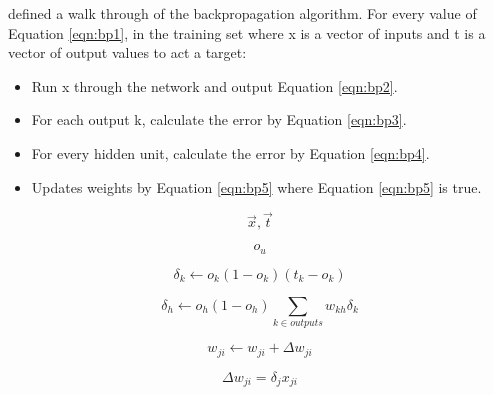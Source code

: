 \parencite{MLANN} defined a walk through of the backpropagation algorithm.
For every value of Equation \ref{eqn:bp1}, in the training set where x is a vector of inputs and t is a vector of output values to act a target:
\begin{itemize}
	\item{Run x through the network and output Equation \ref{eqn:bp2}.}
	\item{For each output k, calculate the error by Equation \ref{eqn:bp3}.}
	\item{For every hidden unit, calculate the error by Equation \ref{eqn:bp4}.}
	\item{Updates weights by Equation \ref{eqn:bp5} where Equation \ref{eqn:bp5} is true.}
\end{itemize}

\begin{equation}\label{eqn:bp1}
    \vec{x}, \vec{t}
\end{equation}

\begin{equation}\label{eqn:bp2}
    o_{u}
\end{equation}

\begin{equation}\label{eqn:bp3}
    \delta_{k} \leftarrow o_{k}(1 - o_{k})(t_{k} - o_{k}) 
\end{equation}

\begin{equation}\label{eqn:bp4}
    \delta_{h} \leftarrow o_{h}(1 - o_{h}) \sum_{k \in outputs}   w_{kh}\delta_{k}
\end{equation}

\begin{equation}\label{eqn:bp5}
    w_{ji} \leftarrow w_{ji} + \Delta w_{ji}
\end{equation}

\begin{equation}\label{eqn:bp6}
    \Delta w_{ji} = \delta_{j} x_{ji}
\end{equation}
